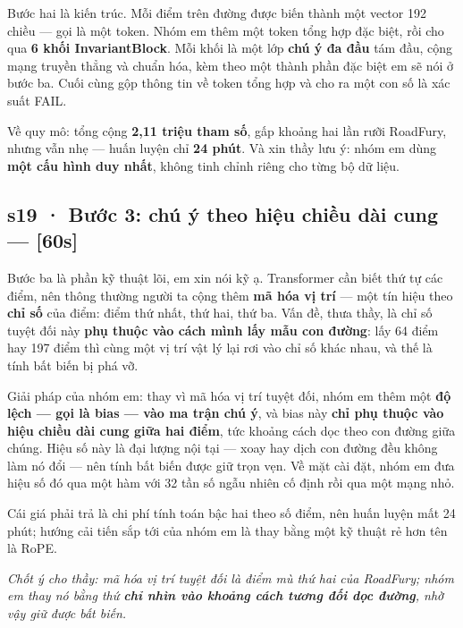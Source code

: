 \documentclass[
  11pt,
]{article}
\renewenvironment{quote}
  {\par\smallskip\noindent
   \def\FrameCommand{{\color{deckorange}\vrule width 2.5pt}\hspace{10pt}}%
   \MakeFramed{\advance\hsize-\width\FrameRestore}%
   \footnotesize\itshape\color{deckslate}}
  {\par\endMakeFramed\smallskip}
\begin{document}
Bước hai là kiến trúc. Mỗi điểm trên đường được biến thành một vector
192 chiều --- gọi là một token. Nhóm em thêm một token tổng hợp đặc
biệt, rồi cho qua \textbf{6 khối InvariantBlock}. Mỗi khối là một lớp
\textbf{chú ý đa đầu} tám đầu, cộng mạng truyền thẳng và chuẩn hóa, kèm
theo một thành phần đặc biệt em sẽ nói ở bước ba. Cuối cùng gộp thông
tin về token tổng hợp và cho ra một con số là xác suất FAIL.

Về quy mô: tổng cộng \textbf{2,11 triệu tham số}, gấp khoảng hai lần
rưỡi RoadFury, nhưng vẫn nhẹ --- huấn luyện chỉ \textbf{24 phút}. Và xin
thầy lưu ý: nhóm em dùng \textbf{một cấu hình duy nhất}, không tinh
chỉnh riêng cho từng bộ dữ liệu.

\subsection{s19 · Bước 3: chú ý theo hiệu chiều dài cung ---
{[}60s{]}}\label{s19-bux1b0ux1edbc-3-chuxfa-uxfd-theo-hiux1ec7u-chiux1ec1u-duxe0i-cung-60s}

Bước ba là phần kỹ thuật lõi, em xin nói kỹ ạ. Transformer cần biết thứ
tự các điểm, nên thông thường người ta cộng thêm \textbf{mã hóa vị trí}
--- một tín hiệu theo \textbf{chỉ số} của điểm: điểm thứ nhất, thứ hai,
thứ ba. Vấn đề, thưa thầy, là chỉ số tuyệt đối này \textbf{phụ thuộc vào
cách mình lấy mẫu con đường}: lấy 64 điểm hay 197 điểm thì cùng một vị
trí vật lý lại rơi vào chỉ số khác nhau, và thế là tính bất biến bị phá
vỡ.

Giải pháp của nhóm em: thay vì mã hóa vị trí tuyệt đối, nhóm em thêm một
\textbf{độ lệch --- gọi là bias --- vào ma trận chú ý}, và bias này
\textbf{chỉ phụ thuộc vào hiệu chiều dài cung giữa hai điểm}, tức khoảng
cách dọc theo con đường giữa chúng. Hiệu số này là đại lượng nội tại ---
xoay hay dịch con đường đều không làm nó đổi --- nên tính bất biến được
giữ trọn vẹn. Về mặt cài đặt, nhóm em đưa hiệu số đó qua một hàm với 32
tần số ngẫu nhiên cố định rồi qua một mạng nhỏ.

Cái giá phải trả là chi phí tính toán bậc hai theo số điểm, nên huấn
luyện mất 24 phút; hướng cải tiến sắp tới của nhóm em là thay bằng một
kỹ thuật rẻ hơn tên là RoPE.

\begin{quote}
Chốt ý cho thầy: mã hóa vị trí tuyệt đối là điểm mù thứ hai của
RoadFury; nhóm em thay nó bằng thứ \textbf{chỉ nhìn vào khoảng cách
tương đối dọc đường}, nhờ vậy giữ được bất biến.
\end{quote}
\end{document}
